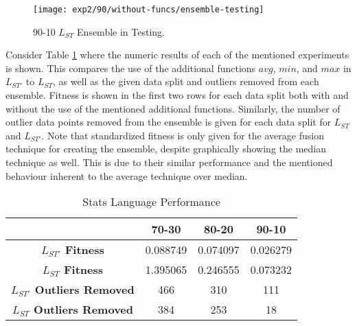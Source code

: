 \documentclass[12pt, letterpaper]{article}
\begin{document}
\begin{figure}[!htb]
\centering
\texttt{[image: exp2/90/without-funcs/ensemble-testing]}
\caption{ 90-10 $L_{ST}$ Ensemble in Testing.}
\label{90-ens-without}
\end{figure}

\textrm{ \indent Consider Table \ref{data-split-results} where the numeric results of each of the mentioned experiments is shown. This compares the use of the additional functions $avg$, $min$, and $max$ in $L_{ST'}$ to $L_{ST}$, as well as the given data split and outliers removed from each ensemble. Fitness is shown in the first two rows for each data split both with and without the use of the mentioned additional functions. Similarly, the number of outlier data points removed from the ensemble is given for each data split for $L_{ST}$ and $L_{ST'}$. Note that standardized fitness is only given for the average fusion technique for creating the ensemble, despite graphically showing the median technique as well. This is due to their similar performance and the mentioned behaviour inherent to the average technique over median.}

\begin{table}[!ht]
\centering
\begin{tabular}{||c|c|c|c||}
\hline
 & \textbf{70-30} & \textbf{80-20} & \textbf{90-10} \\
 \hline
 \textbf{$L_{ST'}$ Fitness} & 0.088749 & 0.074097 & 0.026279 \\
 \hline
 \textbf{$L_{ST}$ Fitness} & 1.395065 & 0.246555 & 0.073232 \\
 \hline
 \textbf{$L_{ST'}$ Outliers Removed} & 466 & 310 & 111 \\
 \hline
 \textbf{$L_{ST}$ Outliers Removed} & 384 & 253 & 18 \\
 \hline
\end{tabular}
\caption{Stats Language Performance}
\label{data-split-results}
\end{table}
\end{document}
